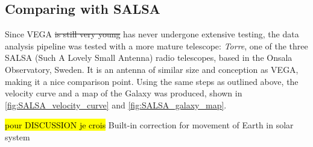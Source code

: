 \subsection{Comparing with SALSA}
Since VEGA \st{is still very young} has never undergone extensive testing, the data analysis pipeline was tested with a more mature telescope: \emph{Torre}, one of the three SALSA (Such A Lovely Small Antenna) radio telescopes, based in the Onsala Observatory, Sweden.
It is an antenna of similar size and conception as VEGA, making it a nice comparison point. Using the same steps as outlined above, the velocity curve and a map of the Galaxy was produced, shown in \autoref{fig:SALSA_velocity_curve} and \autoref{fig:SALSA_galaxy_map}.

\hl{pour DISCUSSION je crois} Built-in correction for movement of Earth in solar system

